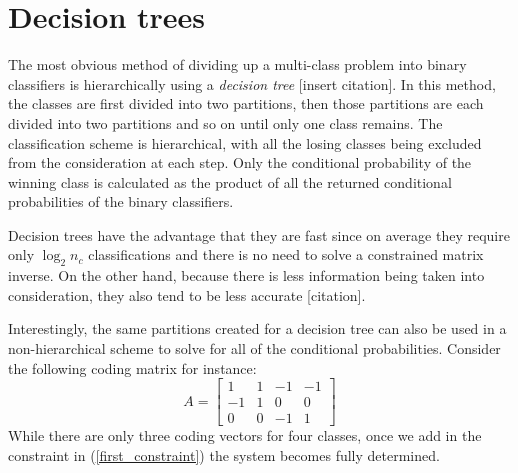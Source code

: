 \documentclass{article}
\begin{document}
\section{Decision trees}

The most obvious method of dividing up a multi-class problem into binary
classifiers is hierarchically using a {\it decision tree} [insert citation].
In this method, the classes are first divided into two partitions, then
those partitions are each divided into two partitions and so on until only
one class remains. The classification scheme is hierarchical, with all the
losing classes being excluded from the consideration at each step.
Only the conditional probability of the winning class is calculated as the
product of all the returned conditional probabilities of the binary
classifiers.

Decision trees have the advantage that they are fast since on average they
require only $\log_2 n_c$ classifications and there is no need to solve a 
constrained matrix inverse. On the other hand, because there is less
information being taken into consideration, they also tend to be less
accurate [citation].

Interestingly, the same partitions created for a decision tree can also
be used in a non-hierarchical scheme
to solve for all of the conditional probabilities. Consider the following
coding matrix for instance:
\begin{equation}
A = 
\begin{bmatrix}
1 & 1 & -1 & -1 \\
-1 & 1 & 0 & 0 \\
0 & 0 & -1 & 1
\end{bmatrix}
\end{equation}
While there are only three coding vectors for four classes, 
once we add in the constraint in (\ref{first_constraint}) the system becomes 
fully determined.


\end{document}
